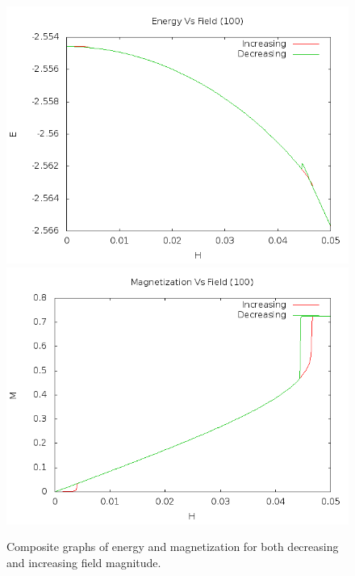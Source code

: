 \documentclass{article}
\begin{document}
\begin{figure}[ht]
\centering
\includegraphics[scale=0.6]{100/100combinedE.png}
\includegraphics[scale=0.6]{100/100combinedM.png}
\caption{Composite graphs of energy and magnetization for both decreasing and increasing field magnitude.}
\end{figure}
\end{document}
